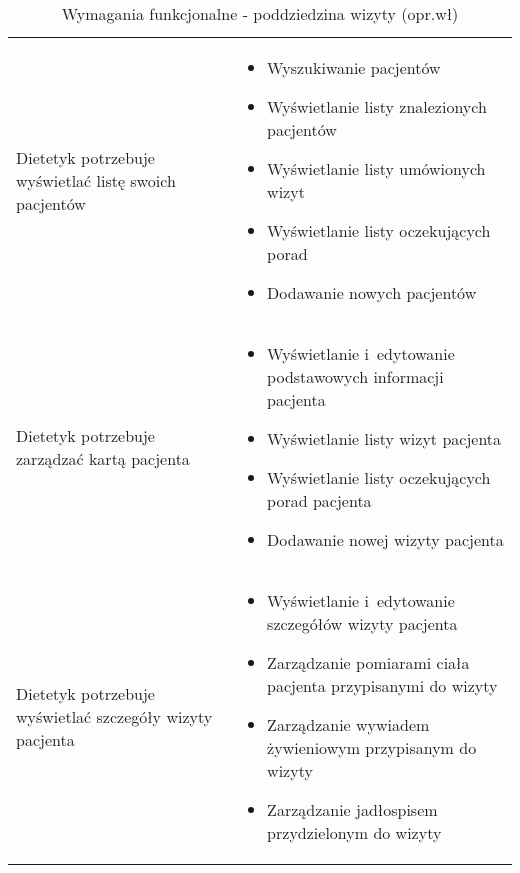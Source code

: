 \begin{minipage}{\textwidth}
    \begin{table}[H]
        \centering\caption{Wymagania funkcjonalne - poddziedzina wizyty (opr.wł)\label{tabela:wymaganiaFunkcjonalneWizyty}}
        \begin{tabular}{|P{.3\textwidth}|P{.6\textwidth}|}
            \hline
             &  \\

            \hline
            Dietetyk potrzebuje wyświetlać listę swoich pacjentów &
            \begin{itemize}
                \item Wyszukiwanie pacjentów
                \item Wyświetlanie listy znalezionych pacjentów
                \item Wyświetlanie listy umówionych wizyt
                \item Wyświetlanie listy oczekujących porad
                \item Dodawanie nowych pacjentów
            \end{itemize} \\
            \hline
            Dietetyk potrzebuje zarządzać kartą pacjenta &
            \begin{itemize}
                \item Wyświetlanie i~edytowanie podstawowych informacji pacjenta
                \item Wyświetlanie listy wizyt pacjenta
                \item Wyświetlanie listy oczekujących porad pacjenta
                \item Dodawanie nowej wizyty pacjenta
            \end{itemize} \\
            \hline
            Dietetyk potrzebuje wyświetlać szczegóły wizyty pacjenta &
            \begin{itemize}
                \item Wyświetlanie i~edytowanie szczegółów wizyty pacjenta
                \item Zarządzanie pomiarami ciała pacjenta przypisanymi do wizyty
                \item Zarządzanie wywiadem żywieniowym przypisanym do wizyty
                \item Zarządzanie jadłospisem przydzielonym do wizyty
            \end{itemize} \\

\end{tabular}
\end{table}
\end{minipage}
